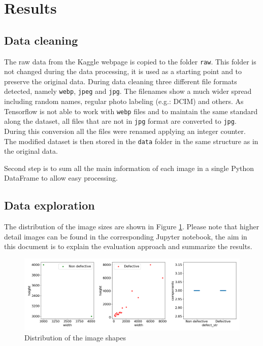 \documentclass[10pt, final]{article}
\begin{document}
\section{Results} \label{sec:results}
\subsection{Data cleaning}
The raw data from the Kaggle webpage \cite{noauthor_railway_nodate} is copied to the folder \lstinline{raw}.
This folder is not changed during the data processing, it is used as a starting point and to preserve the
original data.
During data cleaning three different file formats detected, namely \lstinline{webp}, \lstinline{jpeg}
and \lstinline{jpg}.
The filenames show a much wider spread including random names, regular photo labeling (e.g.: DCIM) and others.
As Tensorflow is not able to work with \lstinline{webp} files and to maintain the same standard along
the dataset, all files that are not in \lstinline{jpg} format are converted to \lstinline{jpg}.
During this conversion all the files were renamed applying an integer counter.
The modified dataset is then stored in the \lstinline{data} folder in the same structure as in the original data.

Second step is to sum all the main information of each image in a single Python DataFrame to allow easy processing.

\subsection{Data exploration} \label{sec:data_exploration}
The distribution of the image sizes are shown in Figure \ref{fig:shape_dist}.
Please note that higher detail images can be found in the corresponding Jupyter notebook, the aim in this document
is to explain the evaluation approach and summarize the results.
\begin{figure}[!ht]
	\centering
	\includegraphics[width=\textwidth]{./tex_graphs/shapes.png}
	\caption{Distribution of the image shapes}
	\label{fig:shape_dist}
\end{figure}
\end{document}
